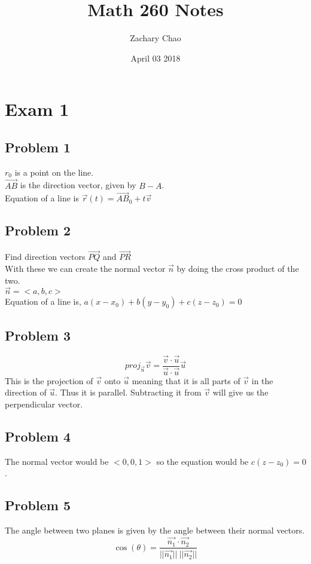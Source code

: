 \documentclass[12pt, letterpaper, twoside]{article}
\title{Math 260 Notes}
\author{Zachary Chao}
\date{April 03 2018}
\begin{document}
  \section*{Exam 1}
    \subsection*{Problem 1}
      $r_0$ is a point on the line.\\
      $\vec{AB}$ is the direction vector, given by $B - A$.\\
      Equation of a line is $\vec{r}(t) = \vec{AB}_0 + t\vec{v}$
    \subsection*{Problem 2}
      Find direction vectors $\vec{PQ}$ and $\vec{PR}$\\
      With these we can create the normal vector $\vec{n}$ by doing the cross product of the two.\\
      $\vec{n} = <a, b, c>$\\
      Equation of a line is, $a(x-x_0) + b(y-y_0) + c(z-z_0) = 0$
    \subsection*{Problem 3}
      $$proj_{\vec{u}} \vec{v} = \frac{\vec{v} \cdot \vec{u}}{\vec{u} \cdot \vec{u}} \vec{u}$$
      This is the projection of $\vec{v}$ onto $\vec{u}$ meaning that it is all parts of $\vec{v}$ in the direction of $\vec{u}$. Thus it is parallel. Subtracting it from $\vec{v}$ will give us the perpendicular vector.
      
    \subsection{Problem 4}
      The normal vector would be $<0,0,1>$ so the equation would be $c(z-z_0) = 0$.
    \subsection*{Problem 5}
      The angle between two planes is given by the angle between their normal vectors.
      $$\cos(\theta) = \frac{\vec{n_1} \cdot \vec{n_2}}{||\vec{n_1}|| \ ||\vec{n_2}||}$$
      
\end{document}
